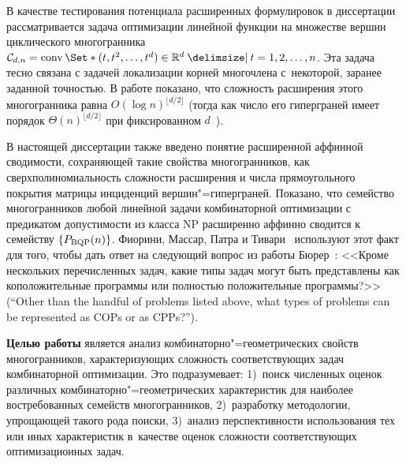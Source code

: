 В качестве тестирования потенциала расширенных формулировок в диссертации рассматривается задача оптимизации линейной функции на множестве вершин циклического многогранника \(\CP_{d,n} = \conv\Set*{(t, t^2, \dots, t^d)\in \R^d \given t = 1,2,\dots,n}\).
Эта задача тесно связана с задачей локализации корней многочлена %
с~некоторой, заранее заданной точностью. В работе показано, что сложность расширения этого многогранника равна $O(\log n)^{\lfloor d/2 \rfloor}$ (тогда как число его гиперграней имеет порядок $\Theta(n)^{\lfloor d/2 \rfloor}$ при фиксированном $d$~\cite{Gale:1963}).

В настоящей диссертации также введено понятие расширенной аффинной сводимости, сохраняющей такие свойства многогранников, как сверхполиномиальность сложности расширения и числа прямоугольного покрытия матрицы инциденций вершин"=гиперграней. Показано, что семейство многогранников любой линейной задачи комбинаторной оптимизации с предикатом допустимости из класса NP расширенно аффинно сводится к семейству $\{P_{\textup{BQP}}(n)\}$.
Фиорини, Массар, Патра и Тивари~\cite{Fiorini:2014} используют этот факт для того, чтобы дать ответ на следующий вопрос из работы Бюрер~\cite{Burer:2009}: <<Кроме нескольких перечисленных задач, какие типы задач могут быть представлены как коположительные программы или полностью положительные программы?>> (\foreignlanguage{english}{``Other than the handful of problems listed above, what types of problems can be represented as COPs or as CPPs?''}).


\textbf{Целью работы}
является анализ комбинаторно"=геометрических свойств многогранников, характеризующих сложность соответствующих задач комбинаторной оптимизации.
Это подразумевает: 
1)~поиск численных оценок различных комбинаторно"=геометрических характеристик для наиболее востребованных семейств многогранников, 
2)~разработку методологии, упрощающей такого рода поиски,
3)~анализ перспективности использования тех или иных характеристик в~качестве оценок сложности соответствующих оптимизационных задач.


